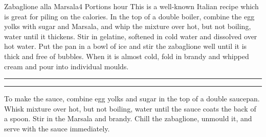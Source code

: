 
\begin{recipe}[Zabaglione]{Zabaglione alla Marsala}{4 Portions}{ hour}
\freeform This is a well-known Italian recipe which is
great for piling on the calories.
In the top of a double boiler, combine the egg yolks with sugar and
Marsala, and whip the mixture over hot, but not boiling, water until it
thickens. Stir in gelatine, softened in cold water and dissolved over hot
water.
Put the pan in a bowl of ice and stir the
zabaglione well until it is thick and free of bubbles. When it is almost
cold, fold in brandy and whipped cream and pour into individual moulds.
\freeform\rule{\textwidth}{0.05pt}\newpage
\freeform\rule{\textwidth}{0.05pt}
To make the sauce, combine egg yolks and sugar in the top of a double
saucepan. Whisk mixture over hot, but not boiling, water until the
sauce coats
the back of a spoon. Stir in the Marsala and brandy.
\newstep
Chill the zabaglione, unmould it, and serve with the sauce immediately.
\freeform\hrulefill
\end{recipe}
